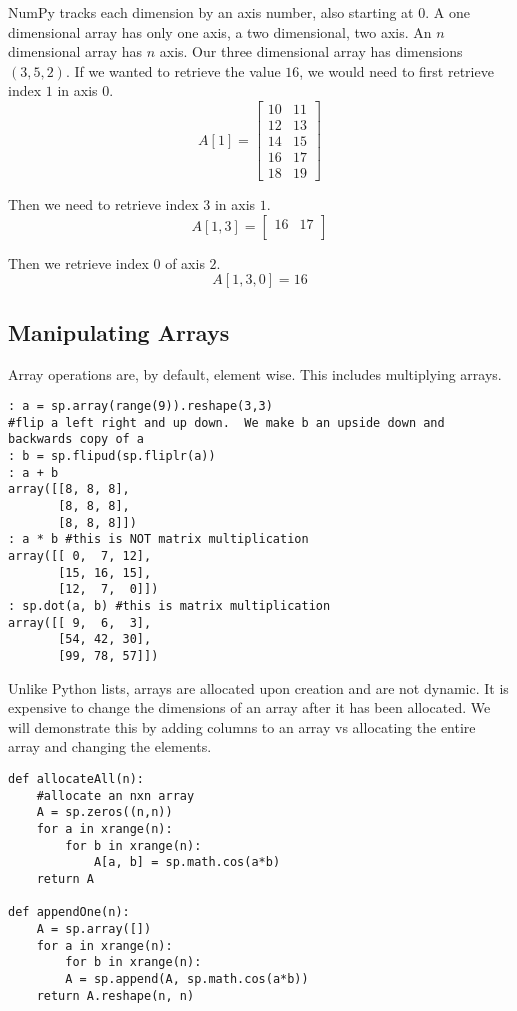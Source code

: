NumPy tracks each dimension by an axis number, also starting at $0$.  A one dimensional array has only one axis, a two dimensional, two axis.  An $n$ dimensional array has $n$ axis.  Our three dimensional array has dimensions $(3,5,2)$.  If we wanted to retrieve the value $16$, we would need to first retrieve index $1$ in axis $0$.
\[
A[1] = \begin{bmatrix}
10 & 11 \\
12 & 13 \\
14 & 15 \\
16 & 17 \\
18 & 19
\end{bmatrix}
\]

Then we need to retrieve index $3$ in axis $1$.
\[
A[1,3] = \begin{bmatrix}
         16 & 17 \\
         \end{bmatrix}
\]

Then we retrieve index $0$ of axis $2$.
\[
A[1,3,0] = 16
\]

\subsection*{Manipulating Arrays}
Array operations are, by default, element wise.  This includes multiplying arrays.

\begin{lstlisting}[style=python]
: a = sp.array(range(9)).reshape(3,3)
#flip a left right and up down.  We make b an upside down and backwards copy of a
: b = sp.flipud(sp.fliplr(a))
: a + b
array([[8, 8, 8],
       [8, 8, 8],
       [8, 8, 8]])
: a * b #this is NOT matrix multiplication
array([[ 0,  7, 12],
       [15, 16, 15],
       [12,  7,  0]])
: sp.dot(a, b) #this is matrix multiplication
array([[ 9,  6,  3],
       [54, 42, 30],
       [99, 78, 57]])
\end{lstlisting}

Unlike Python lists, arrays are allocated upon creation and are not dynamic.  It is expensive to change the dimensions of an array after it has been allocated.  We will demonstrate this by adding columns to an array vs allocating the entire array and changing the elements.

\begin{lstlisting}[style=python]
def allocateAll(n):
    #allocate an nxn array
    A = sp.zeros((n,n))
    for a in xrange(n):
        for b in xrange(n):
            A[a, b] = sp.math.cos(a*b)
    return A

def appendOne(n):
    A = sp.array([])
    for a in xrange(n):
        for b in xrange(n):
	    A = sp.append(A, sp.math.cos(a*b))
    return A.reshape(n, n)
\end{lstlisting}

